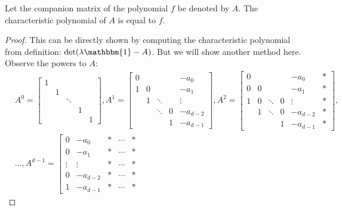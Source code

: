 \begin{theorem}
    Let the companion matrix of the polynomial $f$ be denoted by $A$. The characteristic polynomial of $A$ is equal to $f$.
\end{theorem}
\begin{proof}
    This can be directly shown by computing the characteristic polynomial from definition: $\det(\lambda\mathbbm{1}-A)$. But we will show another method here. Observe the powers to $A$:
    \begin{align*}
        &A^0 = \left[\begin{matrix}
            1 &   &        &   &   \\
              & 1 &        &   &   \\
              &   & \ddots &   &   \\
              &   &        & 1 &   \\
              &   &        &   & 1
        \end{matrix}\right],
        A^1 = \left[\begin{matrix}
            0 &   &        &   & -a_0     \\
            1 & 0 &        &   & -a_1     \\
              & 1 & \ddots &   & \vdots  \\
              &   & \ddots & 0 & -a_{d-2} \\
              &   &        & 1 & -a_{d-1}
        \end{matrix}\right],
        A^2 = \left[\begin{matrix}
            0 &   &        &   & -a_0     & * \\
            0 & 0 &        &   & -a_1     & * \\
            1 & 0 & \ddots & 0 & \vdots  & * \\
              & 1 & \ddots & 0 & -a_{d-2} & * \\
              &   &        & 1 & -a_{d-1} & *
        \end{matrix}\right], \\
        &\ldots, A^{d-1} = \left[\begin{matrix}
            0      & -a_0     & * & \cdots & * \\
            0      & -a_1     & * & \cdots & * \\
            \vdots & \vdots  & * & \cdots & * \\
            0      & -a_{d-2} & * & \cdots & * \\
            1      & -a_{d-1} & * & \cdots & *

\end{matrix}
\end{align*}
\end{proof}
